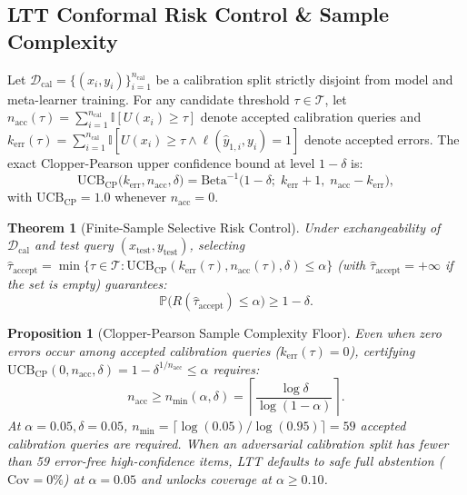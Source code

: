 \documentclass[10pt,conference]{IEEEtran}
\newtheorem{theorem}{Theorem}
\newtheorem{proposition}{Proposition}
\begin{document}
\subsection{LTT Conformal Risk Control \& Sample Complexity}
Let $\mathcal{D}_{\text{cal}} = \{(x_i, y_i)\}_{i=1}^{n_{\text{cal}}}$ be a calibration split strictly disjoint from model and meta-learner training. For any candidate threshold $\tau \in \mathcal{T}$, let $n_{\text{acc}}(\tau) = \sum_{i=1}^{n_{\text{cal}}} \mathbb{I}[U(x_i) \ge \tau]$ denote accepted calibration queries and $k_{\text{err}}(\tau) = \sum_{i=1}^{n_{\text{cal}}} \mathbb{I}[U(x_i) \ge \tau \land \ell(\hat{y}_{1,i}, y_i) = 1]$ denote accepted errors. The exact Clopper-Pearson upper confidence bound at level $1 - \delta$ \cite{clopper1934use} is:
\begin{equation}
    \mathrm{UCB}_{\mathrm{CP}}\big(k_{\text{err}}, n_{\text{acc}}, \delta\big) = \mathrm{Beta}^{-1}\big(1 - \delta;\; k_{\text{err}} + 1,\; n_{\text{acc}} - k_{\text{err}}\big),
\end{equation}
with $\mathrm{UCB}_{\mathrm{CP}} = 1.0$ whenever $n_{\text{acc}} = 0$.

\begin{theorem}[Finite-Sample Selective Risk Control]
Under exchangeability of $\mathcal{D}_{\text{cal}}$ and test query $(x_{\text{test}}, y_{\text{test}})$, selecting $\hat{\tau}_{\text{accept}} = \min \{\tau \in \mathcal{T} : \mathrm{UCB}_{\mathrm{CP}}(k_{\text{err}}(\tau), n_{\text{acc}}(\tau), \delta) \le \alpha\}$ (with $\hat{\tau}_{\text{accept}} = +\infty$ if the set is empty) guarantees:
\begin{equation}
    \mathbb{P}\Big(R(\hat{\tau}_{\text{accept}}) \le \alpha\Big) \ge 1 - \delta.
\end{equation}
\end{theorem}

\begin{proposition}[Clopper-Pearson Sample Complexity Floor]
Even when zero errors occur among accepted calibration queries ($k_{\text{err}}(\tau) = 0$), certifying $\mathrm{UCB}_{\mathrm{CP}}(0, n_{\text{acc}}, \delta) = 1 - \delta^{1/n_{\text{acc}}} \le \alpha$ requires:
\begin{equation}
    n_{\text{acc}} \ge n_{\min}(\alpha, \delta) = \left\lceil \frac{\log \delta}{\log(1 - \alpha)} \right\rceil.
\end{equation}
At $\alpha = 0.05, \delta = 0.05$, $n_{\min} = \lceil \log(0.05)/\log(0.95) \rceil = 59$ accepted calibration queries are required. When an adversarial calibration split has fewer than 59 error-free high-confidence items, LTT defaults to safe full abstention ($\mathrm{Cov} = 0\%$) at $\alpha = 0.05$ and unlocks coverage at $\alpha \ge 0.10$.
\end{proposition}
\end{document}
